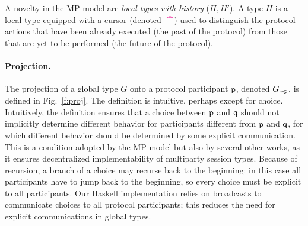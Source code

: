 \documentclass[runningheads,plain]{llncs}
\newcommand{\checkthis}[1]{#1}
\begin{document}
 A novelty in the MP model are \emph{local types with history}  ($H, H'$). A type $H$ is a local type equipped with a
 cursor (denoted~$\,\textcolor{magenta}{\text{\textbf{\textasciicircum\!\!\textasciicircum}}}$) used to distinguish  the  protocol actions  that have been already executed (the past of the protocol) from those that are yet to be performed (the future of the protocol).
 
 \paragraph{Projection.}
The projection of a global type $G$ onto a protocol participant $\mathtt{p}$, denoted $G\!\downarrow_{\mathtt{p}}$,  is defined in Fig.~\ref{f:proj}. 
 The definition is intuitive, perhaps except for choice.
 Intuitively, the definition ensures that a choice between $\mathtt{p}$ and $\mathtt{q}$ should not implicitly determine different behavior for participants different from $\mathtt{p}$ and $\mathtt{q}$, for which different behavior should  be determined by some explicit communication.
 This is a condition adopted by the MP model but also by several other works, as it ensures decentralized implementability of  multiparty session types.
 Because of recursion, a branch of a choice may recurse back to the beginning: in this case
 all participants have to jump back to the beginning,
so every choice must  be explicit  to all participants.
\checkthis{Our Haskell implementation relies on broadcasts to communicate choices to all protocol participants; this reduces the need for explicit communications in global types}. 
\end{document}
